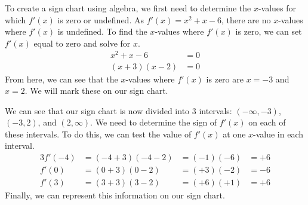 \documentclass{article}
\begin{document}
\begin{enumerate}
\begin{enumerate}
\begin{solution}
      To create a sign chart using algebra, we first need to determine the $x$-values for which $f'(x)$
      is zero or undefined. 
      As $f'(x)=x^2+x-6$, there are no $x$-values where $f'(x)$ is undefined. To find the $x$-values where
      $f'(x)$ is zero, we can set $f'(x)$ equal to zero and solve for $x$.
      \begin{align*}
        x^2 + x - 6 &= 0 \\
        (x+3)(x-2) &= 0
      \end{align*}
      From here, we can see that the $x$-values where $f'(x)$ is zero are $x=-3$ and $x=2$. We will mark
      these on our sign chart.
      \begin{center}
      \end{center}
      We can see that our sign chart is now divided into 3 intervals: $(-\infty, -3)$, $(-3, 2)$, and $(2, \infty)$.
      We need to determine the sign of $f'(x)$ on each of these intervals. To do this, we can test 
      the value of $f'(x)$ at one $x$-value
      in each interval.
      \begin{alignat*}{3}
        f'(-4) &= (-4+3)(-4-2) &= (-1)(-6) &= +6 \\
        f'(0)  &= (0+3)(0-2)   &= (+3)(-2) &= -6 \\
        f'(3)  &= (3+3)(3-2)   &= (+6)(+1) &= +6
      \end{alignat*}
      Finally, we can represent this information on our sign chart.
      \begin{center}
      \end{center}


\end{solution}
\end{enumerate}
\end{enumerate}
\end{document}
